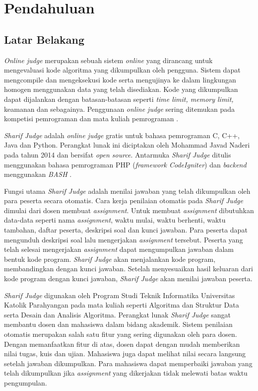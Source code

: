 \chapter{Pendahuluan}
\label{chap:intro}
   
\section{Latar Belakang}
\label{sec:label}
\textit{Online judge} merupakan sebuah sistem \textit{online} yang dirancang untuk mengevaluasi kode algoritma yang dikumpulkan oleh pengguna. Sistem dapat mengcompile dan mengeksekusi kode serta mengujinya ke dalam lingkungan homogen menggunakan data yang telah disediakan. Kode yang dikumpulkan dapat dijalankan dengan batasan-batasan seperti \textit{time limit, memory limit,} keamanan dan sebagainya. Penggunaan \textit{online judge} sering ditemukan pada kompetisi pemrograman dan mata kuliah pemrograman \cite{wasik:18:survey}.

\textit{Sharif Judge} adalah \textit{online judge} gratis untuk bahasa pemrograman C, C++, Java dan Python. Perangkat lunak ini diciptakan oleh Mohammad Javad Naderi pada tahun 2014 dan bersifat \textit{open source}. Antarmuka \textit{Sharif Judge} ditulis menggunakan bahasa pemrograman PHP (\textit{framework CodeIgniter}) dan \textit{backend} menggunakan \textit{BASH} \cite{mjnaderi:14:sharifjudge}.

Fungsi utama \textit{Sharif Judge} adalah menilai jawaban yang telah dikumpulkan oleh para peserta secara otomatis. Cara kerja penilaian otomatis pada \textit{Sharif Judge} dimulai dari dosen membuat \textit{assignment}. Untuk membuat \textit{assignment} dibutuhkan data-data seperti nama \textit{assignment}, waktu mulai, waktu berhenti, waktu tambahan, daftar peserta, deskripsi soal dan kunci jawaban. Para peserta dapat mengunduh deskripsi soal lalu mengerjakan \textit{assignment} tersebut. Peserta yang telah selesai mengerjakan \textit{assignment} dapat mengumpulkan jawaban dalam bentuk kode program. \textit{Sharif Judge} akan menjalankan kode program, membandingkan dengan kunci jawaban. Setelah menyesuaikan hasil keluaran dari kode program dengan kunci jawaban, \textit{Sharif Judge} akan menilai jawaban peserta.

\textit{Sharif Judge} digunakan oleh Program Studi Teknik Informatika Universitas Katolik Parahyangan pada mata kuliah seperti Algoritma dan Struktur Data serta Desain dan Analisis Algoritma. Perangkat lunak \textit{Sharif Judge} sangat membantu dosen dan mahasiswa dalam bidang akademik. Sistem penilaian otomatis merupakan salah satu fitur yang sering digunakan oleh para dosen. Dengan memanfaatkan fitur di atas, dosen dapat dengan mudah memberikan nilai tugas, kuis dan ujian. Mahasiswa juga dapat melihat nilai secara langsung setelah jawaban dikumpulkan. Para mahasiswa dapat memperbaiki jawaban yang telah dikumpulkan jika \textit{assignment} yang dikerjakan tidak melewati batas waktu pengumpulan.

